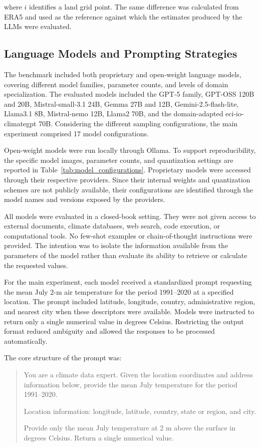 where \(i\) identifies a land grid point. The same difference was calculated from ERA5 and used as the reference against which the estimates produced by the LLMs were evaluated.


\subsection{Language Models and Prompting Strategies}

The benchmark included both proprietary and open-weight language models, covering different model families, parameter counts, and levels of domain specialization. The evaluated models included the GPT-5 family, GPT-OSS 120B and 20B, Mistral-small-3.1 24B, Gemma 27B and 12B, Gemini-2.5-flash-lite, Llama3.1 8B, Mistral-nemo 12B, Llama2 70B, and the domain-adapted eci-io-climategpt 70B. Considering the different sampling configurations, the main experiment comprised 17 model configurations.

Open-weight models were run locally through Ollama. To support reproducibility, the specific model images, parameter counts, and quantization settings are reported in Table~\ref{tab:model_configurations}. Proprietary models were accessed through their respective providers. Since their internal weights and quantization schemes are not publicly available, their configurations are identified through the model names and versions exposed by the providers.

All models were evaluated in a closed-book setting. They were not given access to external documents, climate databases, web search, code execution, or computational tools. No few-shot examples or chain-of-thought instructions were provided. The intention was to isolate the information available from the parameters of the model rather than evaluate its ability to retrieve or calculate the requested values.

For the main experiment, each model received a standardized prompt requesting the mean July 2-m air temperature for the period 1991--2020 at a specified location. The prompt included latitude, longitude, country, administrative region, and nearest city when these descriptors were available. Models were instructed to return only a single numerical value in degrees Celsius. Restricting the output format reduced ambiguity and allowed the responses to be processed automatically.

The core structure of the prompt was:

\begin{quote}
\small
You are a climate data expert. Given the location coordinates and address information below, provide the mean July temperature for the period 1991--2020.

Location information:
longitude, latitude, country, state or region, and city.

Provide only the mean July temperature at 2 m above the surface in degrees Celsius. Return a single numerical value.
\end{quote}

